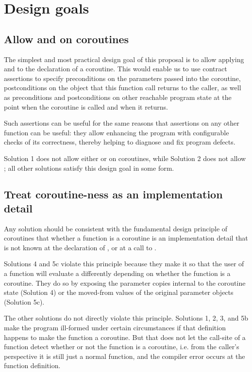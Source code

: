 \section{Design goals}

\subsection{Allow  and  on coroutines}

The simplest and most practical design goal of this proposal is to allow applying  and  to the declaration of a coroutine. This would enable us to use contract assertions to specify preconditions on the parameters passed into the coroutine, postconditions on the object that this function call returns to the caller, as well as preconditions and postconditions on other reachable program state at the point when the coroutine is called and when it returns.

Such assertions can be useful for the same reasons that assertions on any other function can be useful: they allow enhancing the program with configurable checks of its correctness, thereby helping to diagnose and fix program defects.

Solution 1 does not allow either  or  on coroutines, while Solution 2 does not allow ; all other solutions satisfy this design goal in some form.

\subsection{Treat coroutine-ness as an implementation detail}
\label{goal_coro_principle}

Any solution should be consistent with the fundamental design principle of coroutines that whether a function  is a coroutine is an implementation detail that is not known at the declaration of , or at a call to .

Solutions 4 and 5c violate this principle because they make it so that the user of a function will evaluate a  differently depending on whether the function is a coroutine. They do so by exposing the parameter copies internal to the coroutine state (Solution 4) or the moved-from values of the original parameter objects (Solution 5c).

The other solutions do not directly violate this principle. Solutions 1, 2, 3, and 5b make the program ill-formed under certain circumstances if that definition happens to make the function a coroutine. But that does not let the call-site of a function detect whether or not the function is a coroutine, i.e. from the caller's perspective it is still just a normal function, and the compiler error occurs at the function definition.

